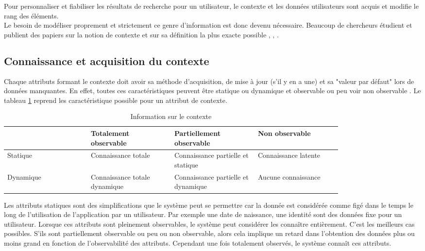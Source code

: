 \documentclass[conference]{./sty/IEEEtran}
\begin{document}
Pour personnaliser et fiabiliser les résultats de recherche pour un
utilisateur, le contexte et les données utilisateurs sont acquis et modifie le
rang des éléments. \\

Le besoin de modéliser proprement et strictement ce genre d'information est
donc devenu nécessaire. Beaucoup de chercheurs étudient et publient des papiers
sur la notion de contexte et sur sa définition la plus exacte possible
\cite{DBLP:journals/tlt/VerbertMOWDBD12},
\cite{DBLP:reference/rsh/AdomaviciusT11},
\cite{DBLP:journals/aim/AdomaviciusMRT11}. \\

\subsection{Connaissance et acquisition du contexte}

Chaque attributs formant le contexte doit avoir sa méthode d'acquisition, de
mise à jour (s'il y en a une) et sa "valeur par défaut" lors de données
manquantes. En effet, toutes ces caractéristiques peuvent être statique ou
dynamique et observable ou peu voir non observable
\cite{DBLP:journals/aim/AdomaviciusMRT11}. Le tableau
\ref{tab:update_observability_context} reprend les caractéristique possible
pour un attribut de contexte. \\

\begin{table}
  \caption{\label{tab:update_observability_context} Information sur le contexte \cite{DBLP:journals/aim/AdomaviciusMRT11}}
  \begin{tabular}{|p{0.20\linewidth}|p{0.20\linewidth}|p{0.20\linewidth}|p{0.20\linewidth}|}
    \hline
    ~ & Totalement observable & Partiellement observable & Non observable \\ \hline
    Statique & Connaissance totale & Connaissance partielle et statique & Connaissance latente \\ \hline
    Dynamique & Connaissance totale dynamique & Connaissance partielle et dynamique & Aucune connaissance \\ \hline
  \end{tabular}
\end{table}

Les attributs statiques sont des simplifications que le système peut se
permettre car la donnée est considérée comme figé dans le temps le long de
l'utilisation de l'application par un utilisateur. Par exemple une date de
naissance, une identité sont des données fixe pour un utilisateur. Lorsque ces
attributs sont pleinement observables, le système peut considérer les connaître
entièrement. C'est les meilleurs cas possibles. S'ils sont partiellement
observable ou peu ou non observable, alors cela implique un retard dans
l'obtention des données plus ou moins grand en fonction de l'observabilité des
attributs. Cependant une fois totalement observés, le système connaît ces
attributs. \\
\end{document}
